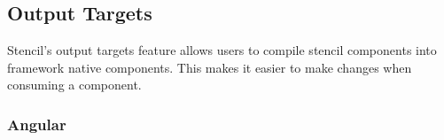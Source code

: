 \subsection{Output Targets}
Stencil's output targets feature allows users to compile stencil components into framework native components. This makes it easier to make changes when consuming a component.
\subsubsection{Angular}

